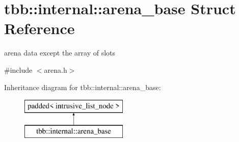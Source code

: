 \hypertarget{structtbb_1_1internal_1_1arena__base}{}\section{tbb\+:\+:internal\+:\+:arena\+\_\+base Struct Reference}
\label{structtbb_1_1internal_1_1arena__base}


arena data except the array of slots  




{\ttfamily \#include $<$arena.\+h$>$}

Inheritance diagram for tbb\+:\+:internal\+:\+:arena\+\_\+base\+:\begin{figure}[H]
\begin{center}
\leavevmode
\includegraphics[height=2.000000cm]{structtbb_1_1internal_1_1arena__base}
\end{center}
\end{figure}

